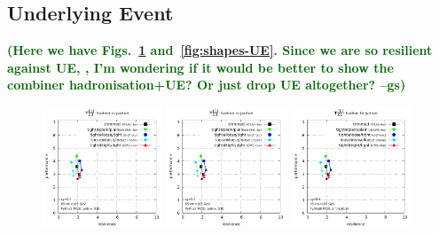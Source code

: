 \documentclass[11pt,letterpaper]{article}
\newcommand{\gs}[1]{\textbf{\textcolor{darkgreen}{(#1 --gs)}}}
\begin{document}
\subsection{Underlying Event}\label{sec:UE}


\gs{Here we have Figs.~\ref{fig:grooming-UE}
  and~\ref{fig:shapes-UE}. Since we are so resilient against UE, , I'm
  wondering if it would be better to show the combiner
  hadronisation+UE? Or just drop UE altogether?}


\begin{figure}
  \includegraphics[width=0.32\textwidth,page=26]{figures/grooming-scan-levels.pdf}
  \hfill
  \includegraphics[width=0.32\textwidth,page=14]{figures/grooming-scan-levels.pdf}
  \hfill
  \includegraphics[width=0.32\textwidth,page=32]{figures/grooming-scan-levels.pdf}
  \caption{}\label{fig:grooming-UE}
\end{figure}
\end{document}
